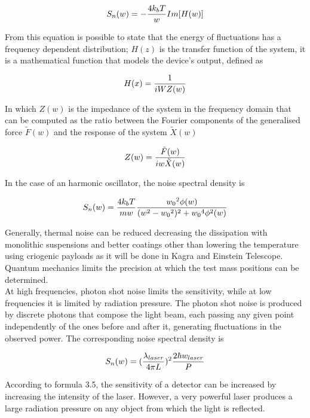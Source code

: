 \documentclass[binding=0.6cm, LaM]{sapthesis}
\begin{document}
		\begin{equation}
		S_{n}(w) = - {{4k_bT} \over {w}} Im[H(w)]
		\end{equation}

	From this equation is possible to state that the energy of fluctuations has a frequency dependent distribution; 
	$H(z)$ is the transfer function of the system, it is a mathematical function that models the device’s output, defined as 

		\begin{equation}
		H(x) = {1 \over {iWZ(w)}}
		\end{equation}

	In which $Z(w)$ is the impedance of the system in the frequency domain that can be computed as the ratio
	between the Fourier components of the generalised force $\tilde F(w)$ and the response of the system $\tilde X(w)$

		\begin{equation}
		Z(w) = {{\tilde F(w)} \over {iw \tilde X(w)}}
		\end{equation}

	In the case of an harmonic oscillator, the noise spectral density is 

		\begin{equation}
		S_n(w) = {{4k_bT} \over {mw}} {{{w_0}^2 \phi(w)} \over {(w^2-{w_0}^2)^2 + {w_0}^4 \phi^2(w)}}
		\end{equation}

	Generally, thermal noise can be reduced decreasing the dissipation with monolithic suspensions and better coatings 
	other than lowering the temperature using criogenic payloads as it will be done in Kagra and Einstein Telescope. \\
	Quantum mechanics limits the precision at which the test mass positions can be determined. \\
	At high frequencies, photon shot noise limits the sensitivity, while at low frequencies it is limited by radiation pressure. 
	The photon shot noise is produced by discrete photons that compose the light beam, 
	each passing any given point independently of the ones before and after it, generating fluctuations in the observed power. 
	The corresponding noise spectral density is 

		\begin{equation}
		S_n(w) = ({{\lambda_{laser}} \over {4 \pi L}})^2 {{2 \hbar w_{laser}} \over {P}}
		\end{equation}

	According to formula 3.5, the sensitivity of a detector can be increased by increasing the intensity of the laser. 
	However, a very powerful laser produces a large radiation pressure on any object from which the light is reflected. 
\end{document}
